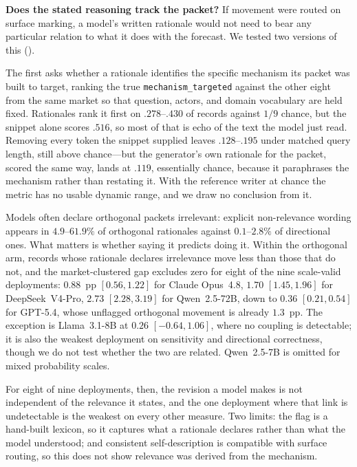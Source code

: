 \textbf{Does the stated reasoning track the packet?} If movement were routed on
surface marking, a model's written rationale would not need to bear any particular
relation to what it does with the forecast. We tested two versions of this
().

The first asks whether a rationale identifies the specific mechanism its packet was
built to target, ranking the true \texttt{mechanism\_targeted} against the other
eight from the same market so that question, actors, and domain vocabulary are held
fixed. Rationales rank it first on $.278$--$.430$ of records against $1/9$ chance,
but the snippet alone scores $.516$, so most of that is echo of the text the model
just read. Removing every token the snippet supplied leaves $.128$--$.195$ under
matched query length, still above chance---but the generator's own rationale for
the packet, scored the same way, lands at $.119$, essentially chance, because it
paraphrases the mechanism rather than restating it. With the reference writer at
chance the metric has no usable dynamic range, and we draw no conclusion from it.

Models often declare orthogonal packets irrelevant: explicit non-relevance wording appears in
$4.9$--$61.9\%$ of orthogonal rationales against $0.1$--$2.8\%$ of directional
ones. What matters is whether saying it predicts doing it. Within the orthogonal
arm, records whose rationale declares irrelevance move less than those that do not,
and the market-clustered gap excludes zero for eight of the nine scale-valid
deployments: $0.88$~pp $[0.56,1.22]$ for Claude Opus~4.8, $1.70$
$[1.45,1.96]$ for DeepSeek~V4-Pro, $2.73$ $[2.28,3.19]$ for Qwen~2.5-72B, down to
$0.36$ $[0.21,0.54]$ for GPT-5.4, whose unflagged orthogonal movement is already
$1.3$~pp. The exception is Llama~3.1-8B at $0.26$ $[-0.64,1.06]$, where no coupling is
detectable; it is also the weakest deployment on sensitivity and directional
correctness, though we do not test whether the two are related. Qwen~2.5-7B is
omitted for mixed probability scales.

For eight of nine deployments, then, the revision a model makes is not independent
of the relevance it states, and the one deployment where that link is undetectable
is the weakest on every other measure. Two limits: the flag is a hand-built
lexicon, so it captures what a rationale declares rather than what the model
understood; and consistent self-description is compatible with surface routing, so
this does not show relevance was derived from the mechanism.

